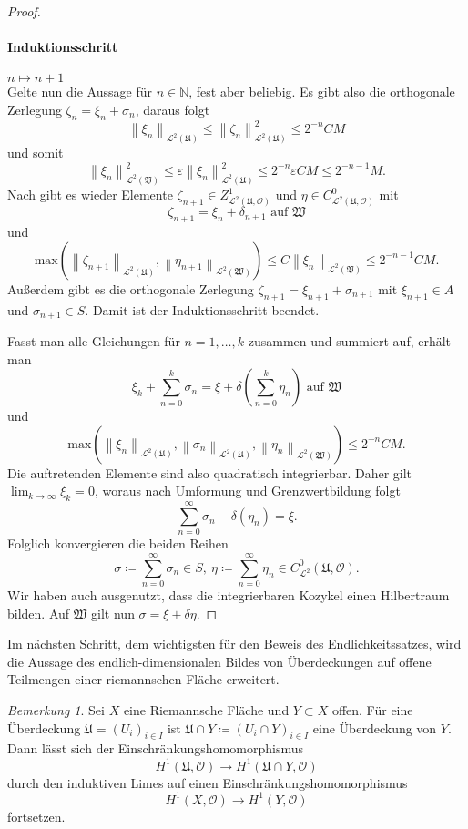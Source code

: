 \documentclass[11pt,a4paper,toc=bibliography]{scrartcl}
\theoremstyle{thm}
\theoremstyle{def}
\theoremstyle{remark}
\newtheorem*{bem}{Bemerkung}
\newcommand*{\norm}[1]{\left\lVert#1\right\rVert} %
\begin{document}
\begin{proof}
\paragraph*{Induktionsschritt} $n\mapsto n+1$\\
Gelte nun die Aussage für $n\in\mathbb{N}$, fest aber beliebig. Es gibt also die orthogonale Zerlegung $\zeta_n=\xi_n+\sigma_n$, daraus folgt
\[
\norm{\xi_n}_{\mathcal{L}^2(\mathfrak{U})}\leq \norm{\zeta_n}_{\mathcal{L}^2(\mathfrak{U})}^2\leq 2^{-n}CM
\]
und somit
\[
\norm{\xi_n}_{\mathcal{L}^2(\mathfrak{V})}^2\leq \varepsilon \norm{\xi_n}_{\mathcal{L}^2(\mathfrak{U})}^2 \leq 2^{-n}\varepsilon CM\leq
2^{-n-1}M.
\]
Nach  gibt es wieder Elemente $\zeta_{n+1}\in Z^1_{\mathcal{L}^2(\mathfrak{U},\mathcal{O})}$ und $\eta\in C^0_{\mathcal{L}^2(\mathfrak{U},\mathcal{O})}$ mit
\[
\zeta_{n+1}=\xi_n+\delta_{n+1}\text{ auf } \mathfrak{W}
\]
und 
\[
\mathrm{max}(\norm{\zeta_{n+1}}_{\mathcal{L}^2(\mathfrak{U})},\norm{\eta_{n+1}}_{\mathcal{L}^2(\mathfrak{W})})\leq C\norm{\xi_n}_{\mathcal{L}^2(\mathfrak{V})}\leq 2^{-n-1}CM.
\]
Außerdem gibt es die orthogonale Zerlegung $\zeta_{n+1}=\xi_{n+1}+\sigma_{n+1}$ mit $\xi_{n+1}\in A$ und $\sigma_{n+1}\in S$. Damit ist der Induktionsschritt beendet.\par
Fasst man alle Gleichungen für $n=1,\ldots,k$ zusammen und summiert auf, erhält man 
\[
\xi_k+\sum_{n=0}^k \sigma_n = \xi+\delta\left(\sum_{n=0}^k \eta_n\right)\text{ auf } \mathfrak{W}
\]
und
\[
\mathrm{max}(\norm{\xi_n}_{\mathcal{L}^2(\mathfrak{U})},\norm{\sigma_n}_{\mathcal{L}^2(\mathfrak{U})},\norm{\eta_n}_{\mathcal{L}^2(\mathfrak{W})})\leq 2^{-n}CM.
\]
Die auftretenden Elemente sind also quadratisch integrierbar. Daher gilt $\lim_{k\rightarrow\infty}\xi_k=0$, woraus nach Umformung und Grenzwertbildung folgt
\[
\sum_{n=0}^{\infty} \sigma_n-\delta (\eta_n)=\xi.
\]
Folglich konvergieren die beiden Reihen
\[
\sigma \coloneqq \sum_{n=0}^{\infty}\sigma_n\in S,~
\eta \coloneqq \sum_{n=0}^{\infty}\eta_n\in C^0_{\mathcal{L}^2}(\mathfrak{U},\mathcal{O}).
\]
Wir haben auch ausgenutzt, dass die integrierbaren Kozykel einen Hilbertraum bilden. Auf $\mathfrak{W}$ gilt nun $\sigma = \xi +\delta\eta.$
\end{proof}

Im nächsten Schritt, dem wichtigsten für den Beweis des Endlichkeitssatzes, wird die Aussage des endlich-dimensionalen Bildes von Überdeckungen auf offene Teilmengen einer riemannschen Fläche erweitert.

\begin{bem}
Sei $X$ eine Riemannsche Fläche und $Y\subset X$ offen. Für eine Überdeckung $\mathfrak{U}=(U_i)_{i\in I}$ ist $\mathfrak{U}\cap Y\coloneqq (U_i\cap Y)_{i\in I}$ eine Überdeckung von $Y$. Dann lässt sich der Einschränkungshomomorphismus 
\[
H^1(\mathfrak{U},\mathcal{O})\rightarrow H^1(\mathfrak{U}\cap Y,\mathcal{O})
\]
durch den induktiven Limes  auf einen Einschränkungshomomorphismus 
\[
H^1(X,\mathcal{O})\rightarrow H^1(Y,\mathcal{O})
\]
fortsetzen.
\end{bem}
\end{document}

